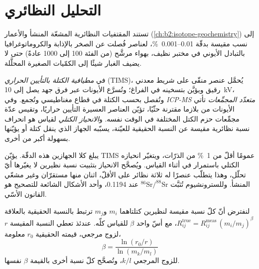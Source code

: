 \section{التحليل النظائري}\label{sec:b2:field-lab-methods-2:isotopes}

تستند المقتفيات النظائرية المشعّة المنشأ والأعمار (\cref{ch:b2:isotope-geochemistry}) إلى نسب مقيسة
بدقّة 0.01--\qty{0.001}{\percent}، لعناصر فُصلت عن الصخر بالإذابة
والكروماتوغرافيا بالتبادل الأيوني في مختبر نظيف، بهواء مرشَّح (من الفئة 100 إلى
1000 عادةً) حتى لا يضيف الغبار شيئًا إلى الكمّيات الصغيرة المحلَّلة.

\begin{definition}\label{def:b2:field-lab-methods-2:tims}
في \emph{مطيافية الكتلة بالتأيين الحراري} (TIMS)، يُحمَّل
عنصر منقّى على شريط معدني رقيق ويؤيَّن بتسخينه في الفراغ؛ وتُسرَّع الأيونات
عبر فرق جهد يصل إلى \qty{10}{kV}، وتُفصل بحسب الكتلة في قطاع مغناطيسي
وتُجمع. وفي \emph{ICP-MS متعدّد المجمِّعات} تأتي الأيونات من
بلازما مقترنة حثّيًا، تؤيّن العناصر العسيرة التأيين حراريًا، وتقيس عدّة
مجمِّعات حزم الكتل المختلفة في الوقت نفسه. و\emph{الانحياز
الكتلي} لقياس هو انحراف نسبة نظائرية مقيسة عن النسبة الحقيقية
للعيّنة، يسبّبه الجهاز الذي ينقل كتلة أو يؤيّنها بسهولة أكبر من
أخرى.
\end{definition}

يبلغ كلا الجهازين هذه الدقّة. يؤيّن TIMS عمومًا أقلّ من
\qty{1}{\percent} من الذرّات، ويتغيّر انحيازه الكتلي باستمرار في أثناء القياس. ويُصحَّح الانحياز بتثبيت نسبة نظيرين لا يغيّرها
أيّ تحلّل، وهذا يتطلّب عنصرًا له ثلاثة نظائر على الأقلّ، اثنان منها مستقرّان وغير
مشعّي المنشأ. وللسترونشيوم تُثبَّت $^{86}\mathrm{Sr}/^{88}\mathrm{Sr}$ عند 0.1194، وأحد الأشكال
الشائعة للتصحيح هو القانون الأسّي.

\begin{proposition}\label{prop:b2:field-lab-methods-2:bias}
لنفترض أنّ كلّ نسبة مقيسة لنظيرين كتلتاهما $m_i$ و$m_j$ ترتبط بالنسبة
الحقيقية بالعلاقة $R_{ij}^{\mathrm{true}} = R_{ij}^{\mathrm{meas}}\,(m_i/m_j)^{\beta}$، مع أسّ واحد
$\beta$ للقياس كلّه. عندئذ تعطي النسبة المقيسة $r$ لزوج مرجعي، قيمته الحقيقية
$r_0$ معلومة،
\begin{equation}
\beta = \frac{\ln(r_0/r)}{\ln(m_k/m_l)}
\label{eq:b2:field-lab-methods-2:beta}
\end{equation}
للزوج المرجعي $k/l$، وتُصحَّح كلّ نسبة أخرى بالقيمة $\beta$ نفسها.
\end{proposition}

